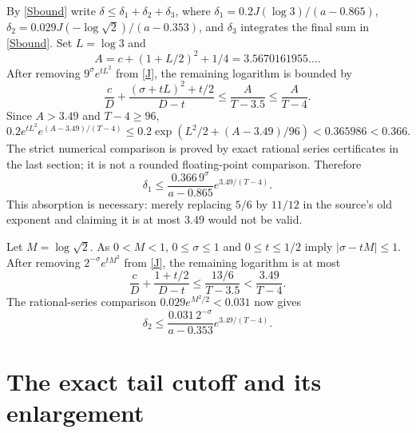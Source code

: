 \documentclass[11pt]{article}
\begin{document}
By \eqref{Sbound} write $\delta\le\delta_1+\delta_2+\delta_3$,
where $\delta_1=0.2J(\log3)/(a-0.865)$,
$\delta_2=0.029J(-\log\sqrt2)/(a-0.353)$, and $\delta_3$
integrates the final sum in \eqref{Sbound}.
Set $L=\log3$ and
\[
 A=c+(1+L/2)^2+1/4=3.5670161955\ldots.
\]
After removing $9^\sigma e^{tL^2}$ from \eqref{J}, the remaining
logarithm is bounded by
\[
 \frac cD+\frac{(\sigma+tL)^2+t/2}{D-t}
 \le\frac A{T-3.5}\le\frac A{T-4}.
\]
Since $A>3.49$ and $T-4\ge96$,
\[
 0.2e^{tL^2}e^{(A-3.49)/(T-4)}
 \le0.2\exp\!\left(L^2/2+(A-3.49)/96\right)
 <0.365986<0.366.
\]
The strict numerical comparison is proved by exact rational series
certificates in the last section; it is not a rounded floating-point
comparison. Therefore
\begin{equation}\label{deltaone}
 \delta_1\le\frac{0.366\,9^\sigma}{a-0.865}e^{3.49/(T-4)}.
\end{equation}
This absorption is necessary: merely replacing $5/6$ by $11/12$
in the source's old exponent and claiming it is at most $3.49$
would not be valid.

Let $M=\log\sqrt2$. As $0<M<1$, $0\le\sigma\le1$ and
$0\le t\le1/2$ imply $|\sigma-tM|\le1$. After removing
$2^{-\sigma}e^{tM^2}$ from \eqref{J}, the remaining logarithm
is at most
\[
 \frac cD+\frac{1+t/2}{D-t}
 \le\frac{13/6}{T-3.5}<\frac{3.49}{T-4}.
\]
The rational-series comparison $0.029e^{M^2/2}<0.031$ now gives
\begin{equation}\label{deltatwo}
 \delta_2\le\frac{0.031\,2^{-\sigma}}{a-0.353}e^{3.49/(T-4)}.
\end{equation}

\section{The exact tail cutoff and its enlargement}
\end{document}
